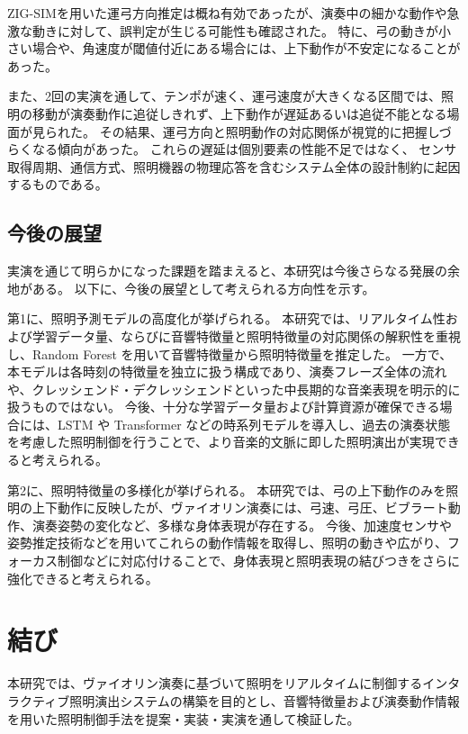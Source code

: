 ZIG-SIMを用いた運弓方向推定は概ね有効であったが、演奏中の細かな動作や急激な動きに対して、誤判定が生じる可能性も確認された。
特に、弓の動きが小さい場合や、角速度が閾値付近にある場合には、上下動作が不安定になることがあった。

また、2回の実演を通して、テンポが速く、運弓速度が大きくなる区間では、照明の移動が演奏動作に追従しきれず、上下動作が遅延あるいは追従不能となる場面が見られた。
その結果、運弓方向と照明動作の対応関係が視覚的に把握しづらくなる傾向があった。
これらの遅延は個別要素の性能不足ではなく、
センサ取得周期、通信方式、照明機器の物理応答を含むシステム全体の設計制約に起因するものである。

\subsection{今後の展望}

実演を通じて明らかになった課題を踏まえると、本研究は今後さらなる発展の余地がある。
以下に、今後の展望として考えられる方向性を示す。

第1に、照明予測モデルの高度化が挙げられる。
本研究では、リアルタイム性および学習データ量、ならびに音響特徴量と照明特徴量の対応関係の解釈性を重視し、Random Forest を用いて音響特徴量から照明特徴量を推定した。
一方で、本モデルは各時刻の特徴量を独立に扱う構成であり、演奏フレーズ全体の流れや、クレッシェンド・デクレッシェンドといった中長期的な音楽表現を明示的に扱うものではない。
今後、十分な学習データ量および計算資源が確保できる場合には、LSTM や Transformer などの時系列モデルを導入し、過去の演奏状態を考慮した照明制御を行うことで、より音楽的文脈に即した照明演出が実現できると考えられる。

第2に、照明特徴量の多様化が挙げられる。
本研究では、弓の上下動作のみを照明の上下動作に反映したが、ヴァイオリン演奏には、弓速、弓圧、ビブラート動作、演奏姿勢の変化など、多様な身体表現が存在する。
今後、加速度センサや姿勢推定技術などを用いてこれらの動作情報を取得し、照明の動きや広がり、フォーカス制御などに対応付けることで、身体表現と照明表現の結びつきをさらに強化できると考えられる。


\section{結び} \label{sec:result}

本研究では、ヴァイオリン演奏に基づいて照明をリアルタイムに制御するインタラクティブ照明演出システムの構築を目的とし、音響特徴量および演奏動作情報を用いた照明制御手法を提案・実装・実演を通して検証した。

